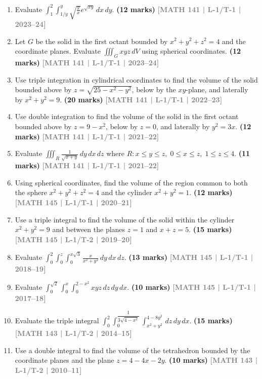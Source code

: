 \documentclass[12pt,a4paper]{article}
\newcommand{\yr}[1]{\hfill\textcolor{gray}{\small\textbf{[#1]}}}
\newcommand{\mk}[1]{\textcolor{orange!70!black}{\small\textbf{(#1 marks)}}}
\begin{document}
\begin{enumerate}\item Evaluate $\displaystyle\int_{1}^{2}\int_{1/y}^{y}\sqrt{\frac{y}{x}}e^{\sqrt{xy}}\,dx\,dy$.
\mk{12} \yr{MATH 141 | L-1/T-1 | 2023--24}

\item Let $G$ be the solid in the first octant bounded by $x^{2}+y^{2}+z^{2}=4$ and the coordinate planes. Evaluate $\displaystyle\iiint_{G}xyz\,dV$ using spherical coordinates.
\mk{12} \yr{MATH 141 | L-1/T-1 | 2023--24}

\item Use triple integration in cylindrical coordinates to find the volume of the solid bounded above by $z=\sqrt{25-x^{2}-y^{2}}$, below by the $xy$-plane, and laterally by $x^{2}+y^{2}=9$.
\mk{20} \yr{MATH 141 | L-1/T-1 | 2022--23}

\item Use double integration to find the volume of the solid in the first octant bounded above by $z=9-x^{2}$, below by $z=0$, and laterally by $y^{2}=3x$.
\mk{12} \yr{MATH 141 | L-1/T-1 | 2021--22}

\item Evaluate $\displaystyle\iiint_{R}\frac{1}{\sqrt{x+y}}\,dy\,dx\,dz$ where $R: x\le y\le z,\;0\le x\le z,\;1\le z\le 4$.
\mk{11} \yr{MATH 141 | L-1/T-1 | 2021--22}


\item Using spherical coordinates, find the volume of the region common to both the sphere $x^{2}+y^{2}+z^{2}=4$ and the cylinder $x^{2}+y^{2}=1$.
\mk{12} \yr{MATH 145 | L-1/T-1 | 2020--21}

\item Use a triple integral to find the volume of the solid within the cylinder $x^{2}+y^{2}=9$ and between the planes $z=1$ and $x+z=5$.
\mk{15} \yr{MATH 145 | L-1/T-2 | 2019--20}

\item Evaluate $\displaystyle\int_{0}^{2}\int_{0}^{z}\int_{0}^{x\sqrt{3}}\frac{x}{x^{2}+y^{2}}\,dy\,dx\,dz$.
\mk{13} \yr{MATH 145 | L-1/T-1 | 2018--19}

\item Evaluate $\displaystyle\int_{0}^{\sqrt{2}}\int_{0}^{x}\int_{0}^{2-x^{2}}xyz\,dz\,dy\,dx$.
\mk{10} \yr{MATH 145 | L-1/T-1 | 2017--18}

\item Evaluate the triple integral $\displaystyle\int_{0}^{2}\int_{0}^{\dfrac{1}{3\sqrt{4-x^{2}}}}\int_{x^{2}+y^{2}}^{4-8y^{2}}\,dz\,dy\,dx$.
\mk{15} \yr{MATH 143 | L-1/T-2 | 2014--15}

\item Use a double integral to find the volume of the tetrahedron bounded by the coordinate planes and the plane $z=4-4x-2y$.
\mk{10} \yr{MATH 143 | L-1/T-2 | 2010--11}

\end{enumerate}
\end{document}
